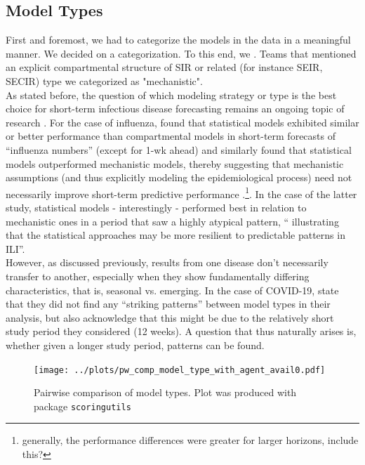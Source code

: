 \subsection{Model Types} \label{sub:model_types_analysis}
First and foremost, we had to categorize the models in the data in a meaningful manner. We decided on a categorization. To this end, we . Teams that mentioned an explicit compartmental structure of SIR or related (for instance SEIR, SECIR) type we categorized as "mechanistic".\\
As stated before, the question of which modeling strategy or type is the best choice for short-term infectious disease forecasting remains an ongoing topic of research \cite{funk_short-term_nodate}. For the case of influenza, \cite{reich_collaborative_2019} found that statistical models exhibited similar or better performance than compartmental models in short-term forecasts of ``influenza numbers'' (except for 1-wk ahead) and \cite{the_influenza_forecasting_working_group_collaborative_2019} similarly found that statistical models outperformed mechanistic models, thereby suggesting that mechanistic assumptions (and thus explicitly modeling the epidemiological process) need not necessarily improve short-term predictive performance \cite{funk_short-term_nodate}.\footnote{generally, the performance differences were greater for larger horizons, include this?}. In the case of the latter study, statistical models - interestingly - performed best in relation to mechanistic ones in a period that saw a highly atypical pattern, `` illustrating that the statistical approaches may be more resilient to predictable patterns in ILI''.\\
However, as discussed previously, results from one disease don't necessarily transfer to another, especially when they show fundamentally differing characteristics, that is, seasonal vs. emerging. In the case of COVID-19, \citep{bracher_evaluating_2021} state that they did not find any ``striking patterns'' between model types in their analysis, but also acknowledge that this might be due to the relatively short study period they considered (12 weeks). A question that thus naturally arises is, whether given a longer study period, patterns can be found.\\
\begin{figure}
\centering
\texttt{[image: ../plots/pw\_comp\_model\_type\_with\_agent\_avail0.pdf]}
\caption{Pairwise comparison of model types. Plot was produced with package \texttt{scoringutils}}
\label{fig:pw_comp_modeltypes}
\end{figure}
